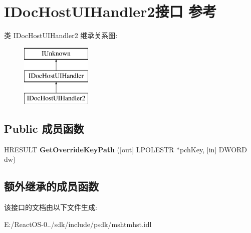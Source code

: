 \hypertarget{interface_i_doc_host_u_i_handler2}{}\section{I\+Doc\+Host\+U\+I\+Handler2接口 参考}
\label{interface_i_doc_host_u_i_handler2}
类 I\+Doc\+Host\+U\+I\+Handler2 继承关系图\+:\begin{figure}[H]
\begin{center}
\leavevmode
\includegraphics[height=3.000000cm]{interface_i_doc_host_u_i_handler2}
\end{center}
\end{figure}
\subsection*{Public 成员函数}
\begin{DoxyCompactItemize}
\item 
\mbox{\label{interface_i_doc_host_u_i_handler2_adb0c3ee6a8f078aa4b7af32a77e7d958}} 
H\+R\+E\+S\+U\+LT {\bfseries Get\+Override\+Key\+Path} (\mbox{[}out\mbox{]} L\+P\+O\+L\+E\+S\+TR $\ast$pch\+Key, \mbox{[}in\mbox{]} D\+W\+O\+RD dw)
\end{DoxyCompactItemize}
\subsection*{额外继承的成员函数}


该接口的文档由以下文件生成\+:\begin{DoxyCompactItemize}
\item 
E\+:/\+React\+O\+S-\/0../sdk/include/psdk/mshtmhst.\+idl\end{DoxyCompactItemize}
